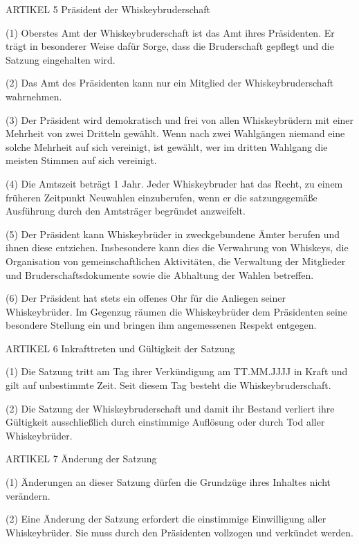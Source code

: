     ARTIKEL 5
    Präsident der Whiskeybruderschaft

(1) Oberstes Amt der Whiskeybruderschaft ist das Amt ihres Präsidenten. Er trägt in besonderer Weise dafür Sorge, dass die Bruderschaft gepflegt und die Satzung eingehalten wird.

(2) Das Amt des Präsidenten kann nur ein Mitglied der Whiskeybruderschaft wahrnehmen.

(3) Der Präsident wird demokratisch und frei von allen Whiskeybrüdern mit einer Mehrheit von zwei Dritteln gewählt. Wenn nach zwei Wahlgängen niemand eine solche Mehrheit auf sich vereinigt, ist gewählt, wer im dritten Wahlgang die meisten Stimmen auf sich vereinigt.

(4) Die Amtszeit beträgt 1 Jahr. Jeder Whiskeybruder hat das Recht, zu einem früheren Zeitpunkt Neuwahlen einzuberufen, wenn er die satzungsgemäße Ausführung durch den Amtsträger begründet anzweifelt.

(5) Der Präsident kann Whiskeybrüder in zweckgebundene Ämter berufen und ihnen diese entziehen. Insbesondere kann dies die Verwahrung von Whiskeys, die Organisation von gemeinschaftlichen Aktivitäten, die Verwaltung der Mitglieder und Bruderschaftsdokumente sowie die Abhaltung der Wahlen betreffen.

(6) Der Präsident hat stets ein offenes Ohr für die Anliegen seiner Whiskeybrüder. Im Gegenzug räumen die Whiskeybrüder dem Präsidenten seine besondere Stellung ein und bringen ihm angemessenen Respekt entgegen.



    ARTIKEL 6
    Inkrafttreten und Gültigkeit der Satzung

(1) Die Satzung tritt am Tag ihrer Verkündigung am TT.MM.JJJJ in Kraft und gilt auf unbestimmte Zeit. Seit diesem Tag besteht die Whiskeybruderschaft.

(2) Die Satzung der Whiskeybruderschaft und damit ihr Bestand verliert ihre Gültigkeit ausschließlich durch einstimmige Auflösung oder durch Tod aller Whiskeybrüder.



    ARTIKEL 7
    Änderung der Satzung

(1) Änderungen an dieser Satzung dürfen die Grundzüge ihres Inhaltes nicht verändern.

(2) Eine Änderung der Satzung erfordert die einstimmige Einwilligung aller Whiskeybrüder. Sie muss durch den Präsidenten vollzogen und verkündet werden.



